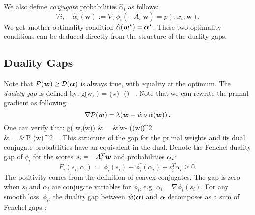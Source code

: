 We  also  define  \emph{conjugate} probabilities $\hat{\alpha}_i$ as follows:
\begin{equation}
	\forall i, \quad \hat{\alpha}_i(\bm w) := \nabla_s\phi_i(-A_i^{\top} \bm w) = p(.|x_i; \bm w).
	\label{primal to dual}
\end{equation}
We get another optimality condition $\hat{\alpha}(\bm w^{\star}) = \boldsymbol{\alpha}^{\star}$.
These two optimality conditions can be deduced directly from the structure of the duality gaps.

\subsection{Duality Gaps}\label{sec:duality gaps}
Note that ${\mathcal P}(\bm w ) \geq {\mathcal D}(\boldsymbol{\alpha})$ is always true, with equality at the optimum. The {\it duality gap} is defined by:
\beq
g(\bm w, \balpha) = \cP(\bm w) -\cD(\balpha) \, .
\eeq
Note that we can rewrite the primal gradient as following:
\begin{equation}\label{primal gradient}
	\nabla {\mathcal P} (\boldsymbol{w}) = \lambda( \boldsymbol{w} - \hat{w}\circ \hat{\alpha}(\bm w) ) \, .
\end{equation}
One can verify that:
\beqa
\label{primal duality gap}
g( \bm w,\hat{\alpha}(\bm w))
& = &  \|\bm w- (\hat{\alpha}(\bm w))\|^2 \\
& = &   \| \nabla \mathcal P (\bm w) \|^2 \, . \label{eq:gradientGap}
\eeqa
This structure of the gap for the primal weights and its dual conjugate probabilities have an equivalent in the dual.
Denote the Fenchel duality gap of $\phi_i$ for the scores $s_i = -A_i^T\boldsymbol{w}$ and probabilities $\boldsymbol{\alpha}_i$:
\begin{equation} \label{eq:Fench}
	F_i(s_i,\alpha_i) := \phi_i(s_i) + \phi_i^*(\alpha_i) + s_i^T \alpha_i \geq 0.
\end{equation}
The positivity comes from the definition of convex conjugates.
The gap is zero when $s_i$ and $\alpha_i$ are conjugate variables for $\phi_i$, e.g. $\alpha_i = \nabla \phi_i(s_i)$.
For any smooth loss~$\phi_i$, the duality gap between $\hat{w}(\boldsymbol{\alpha})$ and $\boldsymbol{\alpha}$ decomposes as a sum of Fenchel gaps \citep{shalev-shwartz_accelerated_2013-1}:
